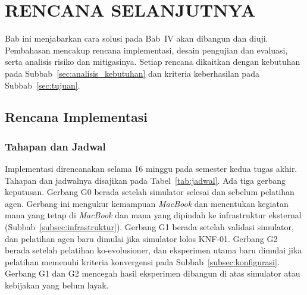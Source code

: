 \cleardoublepage %
\chapter{RENCANA SELANJUTNYA}
\label{chap:rencana-selanjutnya}

Bab ini menjabarkan cara solusi pada Bab~IV akan dibangun dan diuji. Pembahasan mencakup rencana implementasi, desain pengujian dan evaluasi, serta analisis risiko dan mitigasinya. Setiap rencana dikaitkan dengan kebutuhan pada Subbab~\ref{sec:analisis_kebutuhan} dan kriteria keberhasilan pada Subbab~\ref{sec:tujuan}.

\section{Rencana Implementasi}
\label{sec:rencana_implementasi}

\subsection{Tahapan dan Jadwal}
\label{subsec:jadwal}
Implementasi direncanakan selama 16 minggu pada semester kedua tugas akhir. Tahapan dan jadwalnya disajikan pada Tabel~\ref{tab:jadwal}. Ada tiga gerbang keputusan. Gerbang G0 berada setelah simulator selesai dan sebelum pelatihan agen. Gerbang ini mengukur kemampuan \textit{MacBook} dan menentukan kegiatan mana yang tetap di \textit{MacBook} dan mana yang dipindah ke infrastruktur eksternal (Subbab~\ref{subsec:infrastruktur}). Gerbang G1 berada setelah validasi simulator, dan pelatihan agen baru dimulai jika simulator lolos KNF-01. Gerbang G2 berada setelah pelatihan ko-evolusioner, dan eksperimen utama baru dimulai jika pelatihan memenuhi kriteria konvergensi pada Subbab~\ref{subsec:konfigurasi}. Gerbang G1 dan G2 mencegah hasil eksperimen dibangun di atas simulator atau kebijakan yang belum layak.

